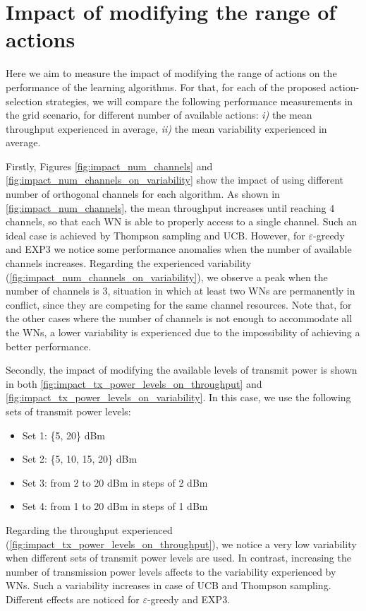 \documentclass[preprint,12pt]{article}
\begin{document}
\section{Impact of modifying the range of actions}
Here we aim to measure the impact of modifying the range of actions on the performance of the learning algorithms. For that, for each of the proposed action-selection strategies, we will compare the following performance measurements in the grid scenario, for different number of available actions: \emph{i)} the mean throughput experienced in average, \emph{ii)} the mean variability experienced in average.

Firstly, Figures \ref{fig:impact_num_channels} and \ref{fig:impact_num_channels_on_variability} show the impact of using different number of orthogonal channels for each algorithm. As shown in \ref{fig:impact_num_channels}, the mean throughput increases until reaching 4 channels, so that each WN is able to properly access to a single channel. Such an ideal case is achieved by Thompson sampling and UCB. However, for $\varepsilon$-greedy and EXP3 we notice some performance anomalies when the number of available channels increases. Regarding the experienced variability (\ref{fig:impact_num_channels_on_variability}), we observe a peak when the number of channels is 3, situation in which at least two WNs are permanently in conflict, since they are competing for the same channel resources. Note that, for the other cases where the number of channels is not enough to accommodate all the WNs, a lower variability is experienced due to the impossibility of achieving a better performance.

Secondly, the impact of modifying the available levels of transmit power is shown in both \ref{fig:impact_tx_power_levels_on_throughput} and \ref{fig:impact_tx_power_levels_on_variability}. In this case, we use the following sets of transmit power levels:
\begin{itemize}
	\item Set 1: \{5, 20\} dBm
	\item Set 2: \{5, 10, 15, 20\} dBm
	\item Set 3: from 2 to 20 dBm in steps of 2 dBm
	\item Set 4: from 1 to 20 dBm in steps of 1 dBm
\end{itemize}
Regarding the throughput experienced (\ref{fig:impact_tx_power_levels_on_throughput}), we notice a very low variability when different sets of transmit power levels are used. In contrast, increasing the number of transmission power levels affects to the variability experienced by WNs. Such a variability increases in case of UCB and Thompson sampling. Different effects are noticed for $\varepsilon$-greedy and EXP3.
\end{document}
